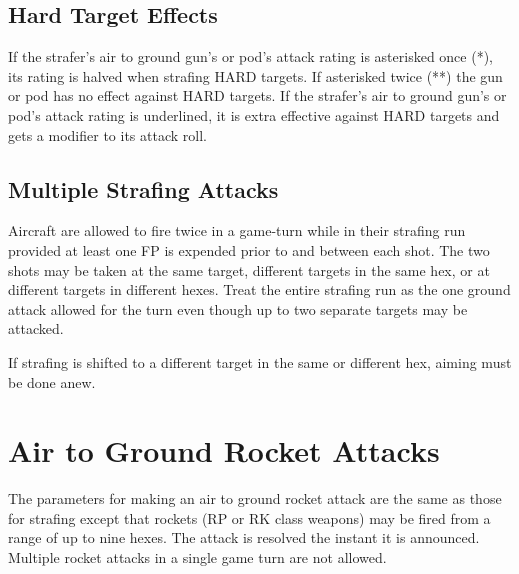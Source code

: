 \subsection{Hard Target Effects} If the strafer's air to ground gun's or pod's attack rating is asterisked once (*), its rating is halved when strafing HARD targets. If asterisked twice (**) the gun or pod has no effect against HARD targets. If the strafer's air to ground gun's or pod's attack rating is underlined, it is extra effective against HARD targets and gets a  modifier to its attack roll.

\subsection{Multiple Strafing Attacks} Aircraft are allowed to fire twice in a game-turn while in their strafing run provided at least one FP is expended prior to and between each shot. The two shots may be taken at the same target, different targets in the same hex, or at different targets in different hexes. Treat the entire strafing run as the one ground attack allowed for the turn even though up to two separate targets may be attacked.

If strafing is shifted to a different target in the same or different hex, aiming must be done anew.

\section{Air to Ground Rocket Attacks}



The parameters for making an air to ground rocket attack are the same as those for strafing except that rockets (RP or RK class weapons) may be fired from a range of up to nine hexes. The attack is resolved the instant it is announced. Multiple rocket attacks in a single game turn are not allowed. 

